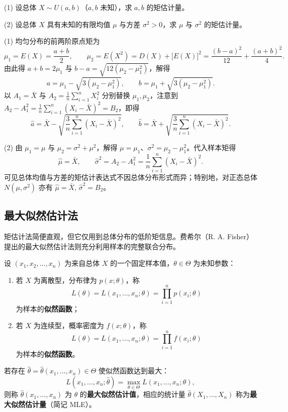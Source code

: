 \begin{example}[title={均匀分布与一般总体均值、方差的矩估计}]
\label{eg:moment-estimation}
(1) 设总体 $X\sim U(a,b)$（$a,b$ 未知），求 $a,b$ 的矩估计量。

(2) 设总体 $X$ 具有未知的有限均值 $\mu$ 与方差 $\sigma^2>0$，求 $\mu$ 与 $\sigma^2$ 的矩估计量。
\begin{solution}
(1) 均匀分布的前两阶原点矩为
\[
  \mu_1=E(X)=\frac{a+b}{2},\qquad
  \mu_2=E(X^2)=D(X)+\bigl[E(X)\bigr]^2=\frac{(b-a)^2}{12}+\frac{(a+b)^2}{4}.
\]
由此得 $a+b=2\mu_1$ 与 $b-a=\sqrt{12(\mu_2-\mu_1^2)}$，解得
\[
  a=\mu_1-\sqrt{3(\mu_2-\mu_1^2)},\qquad
  b=\mu_1+\sqrt{3(\mu_2-\mu_1^2)}.
\]
以 $A_1=\bar{X}$ 与 $A_2=\frac{1}{n}\sum_{i=1}^{n}X_i^2$ 分别替换 $\mu_1,\mu_2$，注意到 $A_2-A_1^2=\frac{1}{n}\sum_{i=1}^{n}(X_i-\bar{X})^2=B_2$，即得
\[
  \hat{a}=\bar{X}-\sqrt{\frac{3}{n}\sum_{i=1}^{n}(X_i-\bar{X})^2},\qquad
  \hat{b}=\bar{X}+\sqrt{\frac{3}{n}\sum_{i=1}^{n}(X_i-\bar{X})^2}.
\]

(2) 由 $\mu_1=\mu$ 与 $\mu_2=\sigma^2+\mu^2$，解得 $\mu=\mu_1$、$\sigma^2=\mu_2-\mu_1^2$。代入样本矩得
\[
  \hat{\mu}=\bar{X},\qquad
  \hat{\sigma}^2=A_2-A_1^2=\frac{1}{n}\sum_{i=1}^{n}(X_i-\bar{X})^2.
\]
可见总体均值与方差的矩估计表达式不因总体分布形式而异；特别地，对正态总体 $N(\mu,\sigma^2)$ 亦有 $\hat{\mu}=\bar{X},\,\hat{\sigma}^2=B_2$。
\end{solution}
\end{example}

\subsection{最大似然估计法}

矩估计法简便直观，但它仅用到总体分布的低阶矩信息。费希尔（R. A. Fisher）提出的最大似然估计法则充分利用样本的完整联合分布。

\begin{definition}[似然函数与最大似然估计]
\label{def:mle}
设 $(x_1,x_2,\ldots,x_n)$ 为来自总体 $X$ 的一个固定样本值，$\theta\in\Theta$ 为未知参数：
\begin{enumerate}
  \item 若 $X$ 为离散型，分布律为 $p(x;\theta)$，称
  \begin{equation}
    L(\theta)=L(x_1,\ldots,x_n;\theta)=\prod_{i=1}^{n}p(x_i;\theta)
    \label{eq:likelihood-discrete}
  \end{equation}
  为样本的\textbf{似然函数}；
  \item 若 $X$ 为连续型，概率密度为 $f(x;\theta)$，称
  \begin{equation}
    L(\theta)=L(x_1,\ldots,x_n;\theta)=\prod_{i=1}^{n}f(x_i;\theta)
    \label{eq:likelihood-continuous}
  \end{equation}
  为样本的\textbf{似然函数}。
\end{enumerate}
若存在 $\hat{\theta}=\hat{\theta}(x_1,\ldots,x_n)\in\Theta$ 使似然函数达到最大：
\[
  L(x_1,\ldots,x_n;\hat{\theta})=\max_{\theta\in\Theta}L(x_1,\ldots,x_n;\theta),
\]
则称 $\hat{\theta}(x_1,\ldots,x_n)$ 为 $\theta$ 的\textbf{最大似然估计值}，相应的统计量 $\hat{\theta}(X_1,\ldots,X_n)$ 称为\textbf{最大似然估计量}（简记 MLE）。
\end{definition}

